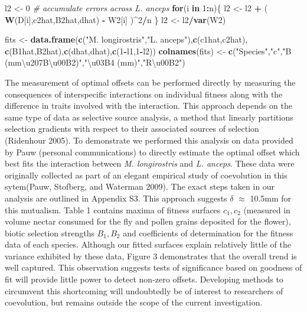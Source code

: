 \documentclass[]{article}
\newenvironment{Shaded}{\begin{snugshade}}{\end{snugshade}}
\newcommand{\CommentTok}[1]{\textcolor[rgb]{0.56,0.35,0.01}{\textit{#1}}}
\newcommand{\ControlFlowTok}[1]{\textcolor[rgb]{0.13,0.29,0.53}{\textbf{#1}}}
\newcommand{\DecValTok}[1]{\textcolor[rgb]{0.00,0.00,0.81}{#1}}
\newcommand{\KeywordTok}[1]{\textcolor[rgb]{0.13,0.29,0.53}{\textbf{#1}}}
\newcommand{\NormalTok}[1]{#1}
\newcommand{\OperatorTok}[1]{\textcolor[rgb]{0.81,0.36,0.00}{\textbf{#1}}}
\newcommand{\StringTok}[1]{\textcolor[rgb]{0.31,0.60,0.02}{#1}}
\begin{document}
\begin{Shaded}
\begin{Highlighting}[]
\NormalTok{l2 <-}\StringTok{ }\DecValTok{0}
\CommentTok{# accumulate errors across L. anceps}
\ControlFlowTok{for}\NormalTok{(i }\ControlFlowTok{in} \DecValTok{1}\OperatorTok{:}\NormalTok{n)\{}
\NormalTok{  l2 <-}\StringTok{ }\NormalTok{l2 }\OperatorTok{+}\StringTok{ }\NormalTok{( }\KeywordTok{W}\NormalTok{(D[i],c2hat,B2hat,dhat) }\OperatorTok{-}\StringTok{ }\NormalTok{W2[i] )}\OperatorTok{^}\DecValTok{2}\OperatorTok{/}\NormalTok{n}
\NormalTok{\}}
\NormalTok{l2 <-}\StringTok{ }\NormalTok{l2}\OperatorTok{/}\KeywordTok{var}\NormalTok{(W2)}

\NormalTok{fits <-}\StringTok{ }\KeywordTok{data.frame}\NormalTok{(}\KeywordTok{c}\NormalTok{(}\StringTok{"M. longirostris"}\NormalTok{,}\StringTok{"L. anceps"}\NormalTok{),}\KeywordTok{c}\NormalTok{(c1hat,c2hat),}
                   \KeywordTok{c}\NormalTok{(B1hat,B2hat),}\KeywordTok{c}\NormalTok{(dhat,dhat),}\KeywordTok{c}\NormalTok{(}\DecValTok{1}\OperatorTok{-}\NormalTok{l1,}\DecValTok{1}\OperatorTok{-}\NormalTok{l2))}
\KeywordTok{colnames}\NormalTok{(fits) <-}\StringTok{ }\KeywordTok{c}\NormalTok{(}\StringTok{"Species"}\NormalTok{,}\StringTok{"c"}\NormalTok{,}\StringTok{"B (mm\textbackslash{}u207B\textbackslash{}u00B2)"}\NormalTok{,}\StringTok{"\textbackslash{}u03B4 (mm)"}\NormalTok{,}\StringTok{"R\textbackslash{}u00B2"}\NormalTok{)}
\end{Highlighting}
\end{Shaded}

The measurement of optimal offsets can be performed directly by
measuring the consequences of interspecific interactions on individual
fitness along with the difference in traits involved with the
interaction. This approach depends on the same type of data as selective
source analysis, a method that linearly partitions selection gradients
with respect to their associated sources of selection (Ridenhour 2005).
To demonstrate we performed this analysis on data provided by Pauw
(personal communications) to directly estimate the optimal offset which
best fits the interaction between \emph{M. longirostris} and \emph{L.
anceps}. These data were originally collected as part of an elegant
empirical study of coevolution in this sytem(Pauw, Stofberg, and
Waterman 2009). The exact steps taken in our analysis are outlined in
Appendix S3. This approach suggests \(\delta\) \(\approx\) 10.5mm for
this mutualism. Table 1 contains maxima of fitness surfaces \(c_1,c_2\)
(measured in volume nectar consumed for the fly and pollen grains
deposited for the flower), biotic selection strengths \(B_1,B_2\) and
coefficients of determination for the fitness data of each species.
Although our fitted surfaces explain relatively little of the variance
exhibited by these data, Figure 3 demonstrates that the overall trend is
well captured. This observation suggests tests of significance based on
goodness of fit will provide little power to detect non-zero offsets.
Developing methods to circumvent this shortcoming will undoubtedly be of
interest to researchers of coevolution, but remains outside the scope of
the current investigation.
\end{document}
